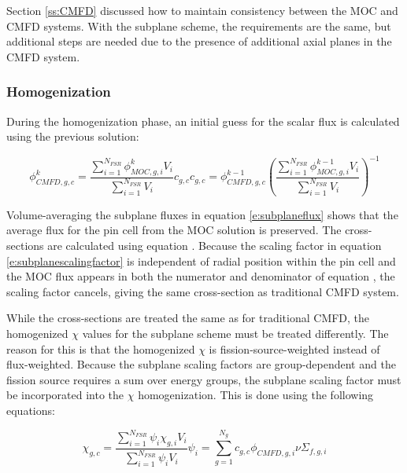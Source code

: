 {Section \ref{ss:CMFD} discussed how to maintain consistency between the MOC and CMFD systems.  With the subplane scheme, the requirements are the same, but additional steps are needed due to the presence of additional axial planes in the CMFD system.

\subsubsection{Homogenization}

During the homogenization phase, an initial guess for the scalar flux is calculated using the previous solution:

\begin{subequations}
\begin{equation}\label{e:subplaneflux}
\phi_{CMFD,g,c}^k = \frac{\sum_{i=1}^{N_{FSR}} \phi_{MOC,g,i}^{k}V_i}{\sum_{i=1}^{N_{FSR}}V_i} c_{g,c}
\end{equation}
\begin{equation}\label{e:subplanescalingfactor}
c_{g,c}=\phi_{CMFD,g,c}^{k-1}\left(\frac{\sum_{i=1}^{N_{FSR}} \phi_{MOC,g,i}^{k-1}V_i}{\sum_{i=1}^{N_{FSR}}V_i}\right)^{-1}
\end{equation}
\end{subequations}

Volume-averaging the subplane fluxes in equation \ref{e:subplaneflux} shows that the average flux for the pin cell from the MOC solution is preserved.  The cross-sections are calculated using equation .  Because the scaling factor in equation \ref{e:subplanescalingfactor} is independent of radial position within the pin cell and the MOC flux appears in both the numerator and denominator of equation , the scaling factor cancels, giving the same cross-section as traditional CMFD system.

While the cross-sections are treated the same as for traditional CMFD, the homogenized $\chi$ values for the subplane scheme must be treated differently.  The reason for this is that the homogenized $\chi$ is fission-source-weighted instead of flux-weighted.  Because the subplane scaling factors are group-dependent and the fission source requires a sum over energy groups, the subplane scaling factor must be incorporated into the $\chi$ homogenization.  This is done using the following equations:

\begin{subequations}
\begin{equation}
\chi_{g,c} = \frac{\sum_{i=1}^{N_{FSR}} \psi_i \chi_{g,i} V_i}{\sum_{i=1}^{N_{FSR}} \psi_i V_i}
\end{equation}
\begin{equation}
\psi_{i} = \sum_{g=1}^{N_g} c_{g,c} \phi_{CMFD,g,i} \nu\Sigma_{f,g,i} 
\end{equation}
\end{subequations}

}
